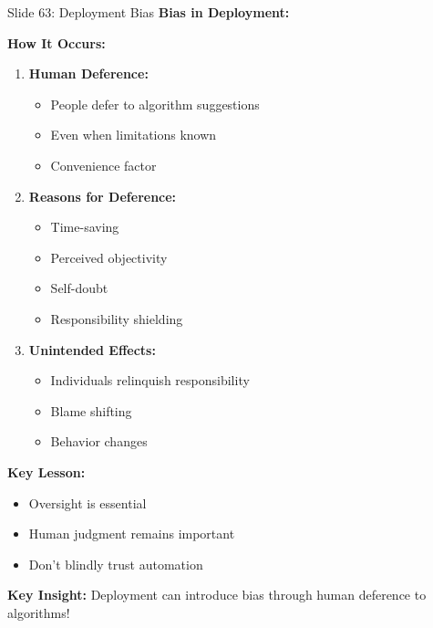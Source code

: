 \documentclass[8pt]{beamer}
\begin{document}
	\begin{frame}{Slide 63: Deployment Bias}
		\fontsize{6.5}{7.5}\selectfont
		\textbf{Bias in Deployment:}
		
		\vspace{0.1cm}
		\textbf{How It Occurs:}
		\begin{enumerate}
			\item \textbf{Human Deference:}
			\begin{itemize}
				\item People defer to algorithm suggestions
				\item Even when limitations known
				\item Convenience factor
			\end{itemize}
			\item \textbf{Reasons for Deference:}
			\begin{itemize}
				\item Time-saving
				\item Perceived objectivity
				\item Self-doubt
				\item Responsibility shielding
			\end{itemize}
			\item \textbf{Unintended Effects:}
			\begin{itemize}
				\item Individuals relinquish responsibility
				\item Blame shifting
				\item Behavior changes
			\end{itemize}
		\end{enumerate}
		
		\vspace{0.1cm}
		\textbf{Key Lesson:}
		\begin{itemize}
			\item Oversight is essential
			\item Human judgment remains important
			\item Don't blindly trust automation
		\end{itemize}
		
		\textcolor{myblue}{\textbf{Key Insight:}} Deployment can introduce \textcolor{myblue}{bias through human deference} to algorithms!
	\end{frame}
	
\end{document}
